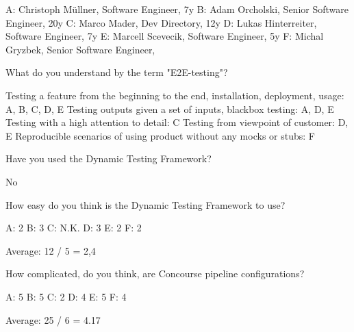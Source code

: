 A: Christoph Müllner, Software Engineer, 7y
B: Adam Orcholski, Senior Software Engineer, 20y
C: Marco Mader, Dev Directory, 12y
D: Lukas Hinterreiter, Software Engineer, 7y
E: Marcell Scevecik, Software Engineer, 5y
F: Michal Gryzbek, Senior Software Engineer,

What do you understand by the term "E2E-testing"?

Testing a feature from the beginning to the end, installation, deployment, usage: A, B, C, D, E
Testing outputs given a set of inputs, blackbox testing: A, D, E
Testing with a high attention to detail: C
Testing from viewpoint of customer: D, E
Reproducible scenarios of using product without any mocks or stubs: F


Have you used the Dynamic Testing Framework?

No


How easy do you think is the Dynamic Testing Framework to use?

A: 2
B: 3
C: N.K.
D: 3
E: 2
F: 2

Average: 12 / 5 = 2,4


How complicated, do you think, are Concourse pipeline configurations?

A: 5
B: 5
C: 2
D: 4
E: 5
F: 4

Average: 25 / 6 = 4.17

